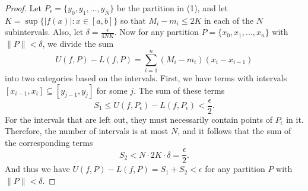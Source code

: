 \documentclass{article}
\newcommand{\nm}[1]{\lVert #1 \rVert}
\newcommand{\abs}[1]{\lvert #1 \rvert}
\begin{document}
\begin{proof}
    Let $P_\epsilon = \{y_0, y_1,...,y_N\}$ be the partition in (1), and let $K = \sup \{\abs{f(x)}: x \in [a,b]\}$ so that $M_i - m_i \leq 2K$ in each of the $N$ subintervals. Also, let $\delta = \frac{\epsilon}{4NK}$. Now for any partition $P = \{x_0, x_1, ..., x_n\}$ with $\nm{P} < \delta$, we divide the sum $$U(f,P) - L(f,P) = \sum_{i=1}^n (M_i - m_i) (x_i - x_{i-1})$$ into two categories based on the intervals. First, we have terms with intervals $[x_{i-1}, x_i] \subseteq [y_{j-1}, y_j]$ for some $j$. The sum of these terms $$S_1 \leq U(f, P_\epsilon) - L(f, P_\epsilon) < \frac{\epsilon}{2}.$$ For the intervals that are left out, they must necessarily contain points of $P_\epsilon$ in it. Therefore, the number of intervals is at most $N$, and it follows that the sum of the corresponding terms $$S_2 < N \cdot 2K \cdot \delta = \frac{\epsilon}{2}.$$ And thus we have $U(f,P) - L(f,P) = S_1 + S_2 < \epsilon$ for any partition $P$ with $\nm{P} < \delta$.
\end{proof}
\end{document}
